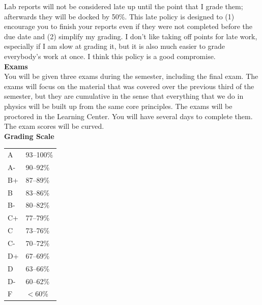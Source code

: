 \documentclass[11pt,letterpaper]{article}
\newcommand{\squeezeup}{\vspace{-2.5mm}}
\begin{document}
Lab reports will not be considered late up until the point that I grade them; afterwards they will be docked by 50\%. This late policy is designed to (1) encourage you to finish your reports even if they were not completed before the due date and (2) simplify my grading. I don't like taking off points for late work, especially if I am slow at grading it, but it is also much easier to grade everybody's work at once. I think this policy is a good compromise. 
\\

\textbf{Exams}\\
You will be given three exams during the semester, including the final exam. The exams will focus on the material that was covered over the previous third of the semester, but they are cumulative in the sense that everything that we do in physics will be built up from the same core principles. The exams will be proctored in the Learning Center. You will have several days to complete them. The exam scores will be curved.\\

\textbf{Grading Scale}
\begin{table}[h!]
\squeezeup
\begin{tabular}{ll}
A & 93--100\% \\
A- & 90--92\% \\
B+ & 87--89\% \\
B & 83--86\% \\
B- & 80--82\% \\
C+ & 77--79\% \\
C & 73--76\% \\
C- & 70--72\% \\
D+ & 67--69\% \\
D & 63--66\% \\
D- & 60--62\% \\
F & $<$60\%
\end{tabular}
\end{table}



\end{document}
